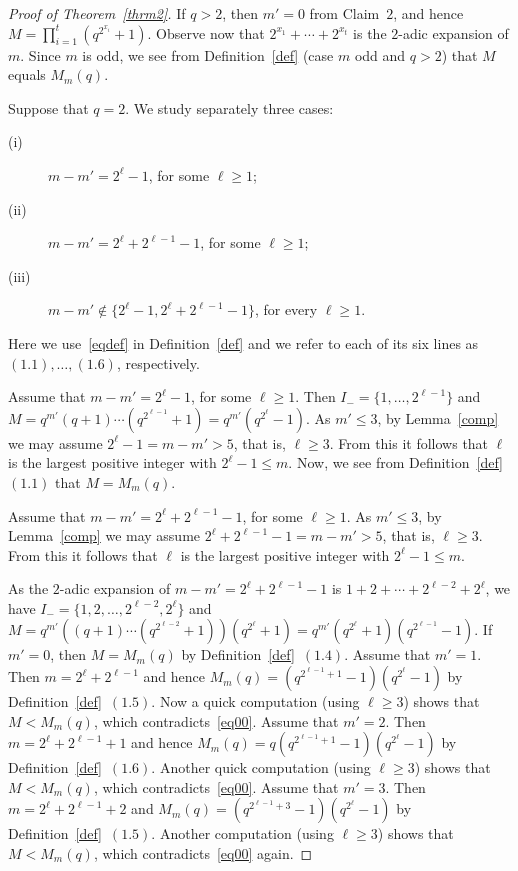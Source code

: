 \documentclass{amsart}
\begin{document}
\begin{proof}[Proof of Theorem~\ref{thrm2}]
If $q>2$, then $m'=0$ from Claim~$2$, and hence $M=\prod_{i=1}^t(q^{2^{x_i}}+1)$. Observe now that $2^{x_1}+\cdots +2^{x_t}$ is the $2$-adic expansion of $m$. Since $m$ is odd, we see from Definition~\ref{def} (case $m$ odd and $q>2$) that $M$ equals $M_m(q)$. 

Suppose that $q=2$. We study separately three cases:
\begin{description}
\item[(i)]$m-m'=2^\ell-1$, for some $\ell\geq 1$;
\item[(ii)]$m-m'=2^\ell+2^{\ell-1}-1$, for some $\ell\geq 1$;
\item[(iii)]$m-m'\notin\{ 2^{\ell}-1,2^{\ell}+2^{\ell-1}-1\}$, for every $\ell\geq 1$.
\end{description}
Here we use~\eqref{eqdef} in Definition~\ref{def} and  we refer to each of its six lines as~$(1.1),\ldots,(1.6)$,  respectively.

Assume that $m-m'=2^\ell-1$, for some $\ell\geq 1$. Then $I_-=\{1,\ldots,2^{\ell-1}\}$ and $M=q^{m'}(q+1)\cdots (q^{2^{\ell-1}}+1)=q^{m'}(q^{2^\ell}-1)$. As $m'\leq 3$, by Lemma~\ref{comp} we may assume $2^{\ell}-1=m-m'>5$, that is, $\ell\geq 3$. From this it follows that $\ell$ is the largest positive integer with $2^\ell-1\leq m$. Now, we see from Definition~\ref{def}~$(1.1)$ that $M=M_m(q)$. 

Assume that $m-m'= 2^\ell+2^{\ell-1}-1$, for some $\ell\geq 1$.  As $m'\leq 3$, by Lemma~\ref{comp} we may assume $2^{\ell}+2^{\ell-1}-1=m-m'>5$, that is, $\ell\geq 3$. From this it follows that $\ell$ is the largest positive integer with $2^\ell-1\leq m$.

As the $2$-adic expansion of $m-m'=2^\ell+2^{\ell-1}-1$ is $1+2+\cdots +2^{\ell-2}+2^{\ell}$, we have $I_-=\{1,2,\ldots,2^{\ell-2},2^{\ell}\}$ and $M=q^{m'}((q+1)\cdots (q^{2^{\ell-2}}+1))(q^{2^\ell}+1)=q^{m'}(q^{2^\ell}+1)(q^{2^{\ell-1}}-1)$. If $m'=0$, then $M=M_m(q)$ by Definition~\ref{def}~$(1.4)$. Assume that $m'=1$. Then $m=2^{\ell}+2^{\ell-1}$ and hence $M_m(q)=(q^{2^{\ell-1}+1}-1)(q^{2^{\ell}}-1)$ by Definition~\ref{def}~$(1.5)$. Now a quick computation (using $\ell\geq 3$) shows that $M<M_m(q)$, which contradicts~\eqref{eq00}. Assume that $m'=2$. Then $m=2^{\ell}+2^{\ell-1}+1$ and hence $M_m(q)=q(q^{2^{\ell-1}+1}-1)(q^{2^{\ell}}-1)$ by Definition~\ref{def}~$(1.6)$. Another quick computation (using $\ell\geq 3$) shows that $M<M_m(q)$, which contradicts~\eqref{eq00}.  Assume that $m'=3$. Then $m=2^{\ell}+2^{\ell-1}+2$ and $M_m(q)=(q^{2^{\ell-1}+3}-1)(q^{2^{\ell}}-1)$  by Definition~\ref{def}~$(1.5)$. Another computation (using $\ell\geq 3$) shows that $M<M_m(q)$, which contradicts~\eqref{eq00} again. 


\end{proof}
\end{document}
